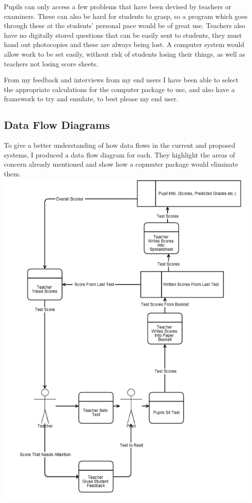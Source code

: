 \documentclass[a4paper,12pt]{report}
\begin{document}
Pupils can only access a few problems that have been devised by teachers or examiners. These can also be hard for students to grasp, so a program which goes through these at the students’ personal pace would be of great use. Teachers also have no digitally stored questions that can be easily sent to students, they must hand out photocopies and these are always being lost. A computer system would allow work to be set easily, without risk of students losing their things, as well as teachers not losing score sheets.\bigskip

From my feedback and interviews from my end users I have been able to select the appropriate calculations for the computer package to use, and also have a framework to try and emulate, to best please my end user.\\
\subsection{Data Flow Diagrams}
To give a better understanding of how data flows in the current and proposed systems, I produced a data flow diagram for each. They highlight the areas of concern already mentioned and show how a copmuter package would eliminate them.\\
\includegraphics[scale = 0.55]{CurrentSystem}\\
\end{document}
